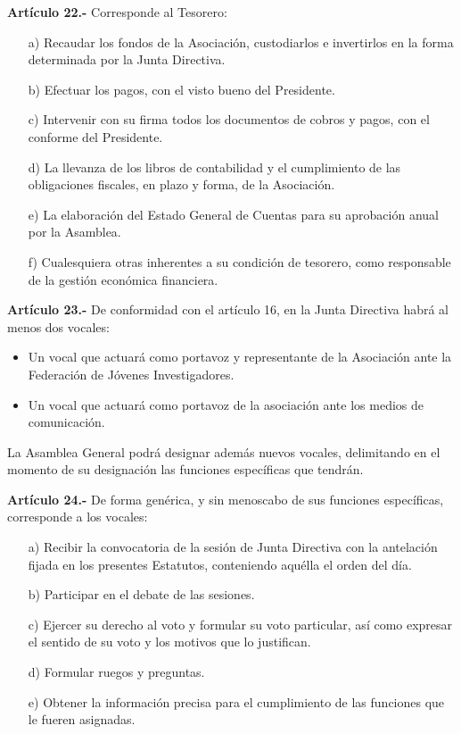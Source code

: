 \documentclass[a4paper,12pt]{article}
\begin{document}
\begin{onehalfspace}
\bigskip\bigskip

\textbf{Art\'iculo 22.-} Corresponde al Tesorero:
\begin{itemize}
\item [a)] Recaudar los fondos de la Asociaci\'on, custodiarlos e invertirlos en la forma determinada por la Junta Directiva.
\item [b)] Efectuar los pagos, con el visto bueno del Presidente.
\item [c)] Intervenir con su firma todos los documentos de cobros y pagos, con el conforme del Presidente.
\item [d)] La llevanza de los libros de contabilidad y el cumplimiento de las obligaciones fiscales, en plazo y forma, de la Asociaci\'on.
\item [e)] La elaboraci\'on del Estado General de Cuentas para su aprobaci\'on anual por la Asamblea.
\item [f)] Cualesquiera otras inherentes a su condici\'on de tesorero, como responsable de la gesti\'on econ\'omica financiera.
\end{itemize}

\bigskip\bigskip

\textbf{Art\'iculo 23.-} De conformidad con el art\'iculo 16, en la Junta Directiva habr\'a al menos dos vocales:
\begin{itemize}
\item  Un vocal que actuar\'a como portavoz y representante de la Asociaci\'on ante la Federaci\'on de J\'ovenes Investigadores.
\item  Un vocal que actuar\'a como portavoz de la asociaci\'on ante los medios de comunicaci\'on.
\end{itemize}

La Asamblea General podr\'a designar adem\'as nuevos vocales, delimitando en el momento de su designaci\'on las funciones espec\'ificas que tendr\'an.

\bigskip\bigskip

\textbf{Art\'iculo 24.-} De forma gen\'erica, y sin menoscabo de sus funciones espec\'ificas, corresponde a los vocales:
\begin{itemize}
\item [a)] Recibir la convocatoria de la sesi\'on de Junta Directiva con la antelaci\'on fijada en los presentes Estatutos, conteniendo aqu\'ella el orden del d\'ia.
\item [b)] Participar en el debate de las sesiones.
\item [c)] Ejercer su derecho al voto y formular su voto particular, as\'i como expresar el sentido de su voto y los motivos que lo justifican.
\item [d)] Formular ruegos y preguntas.
\item [e)] Obtener la informaci\'on precisa para el cumplimiento de las funciones que le fueren asignadas.
\end{itemize}


\end{onehalfspace}
\end{document}
